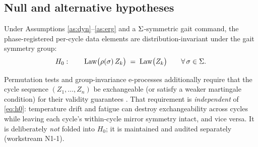\subsection{Null and alternative hypotheses}
\label{sec:h0}

\begin{definition}
\label{def:h0}
Under Assumptions \ref{as:dyn}--\ref{as:erg} and a $\Sigma$-symmetric gait
command, the phase-registered per-cycle data elements are
distribution-invariant under the gait symmetry group:
\begin{equation}
  \label{eq:h0}
  H_0 :\qquad
  \operatorname{Law}\bigl(\rho(\sigma)\, Z_k\bigr) \;=\; \operatorname{Law}\bigl(Z_k\bigr)
  \qquad \forall\, \sigma \in \Sigma .
\end{equation}
\end{definition}

\begin{remark}
\label{rem:exch}
Permutation tests and group-invariance e-processes additionally require that
the cycle sequence $(Z_1, \dots, Z_n)$ be exchangeable (or satisfy a weaker
martingale condition) for their validity guarantees
\cite{hemerik2018exact,perezortiz2024estatistics}. That requirement is
\emph{independent} of \eqref{eq:h0}: temperature drift and fatigue can destroy
exchangeability across cycles while leaving each cycle's within-cycle mirror
symmetry intact, and vice versa. It is deliberately \emph{not} folded into
$H_0$; it is maintained and audited separately (workstream N1-1).
\end{remark}

